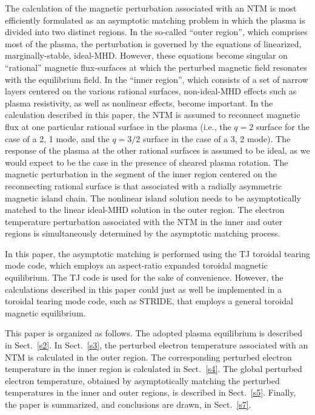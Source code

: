 \documentclass[12pt,prb,aps]{revtex4-1}
\begin{document}
The calculation of the  magnetic perturbation associated with an NTM is most efficiently formulated as an asymptotic matching problem in which the  plasma is  divided into two distinct regions.\cite{tear1,tear2,tear3,tear4,tear5,tear6,tear7,tear8,tear9,tear10}    In the so-called ``outer region'', which comprises most
of the plasma, the perturbation is governed by the equations of linearized, marginally-stable, ideal-MHD.
However, these equations become singular on   ``rational'' magnetic flux-surfaces at which the perturbed magnetic field resonates with the equilibrium field. In the ``inner region'', which
consists of a set of narrow layers centered on the various rational surfaces, non-ideal-MHD effects such as plasma resistivity, as well as nonlinear effects,  become important. 
 In the calculation described in this paper, the NTM is assumed to reconnect magnetic flux at one particular rational surface in the plasma (i.e., the
 $q=2$ surface for the case of a 2, 1 mode, and the $q=3/2$ surface in the case of a 3, 2 mode). The response of the plasma at the
 other rational surfaces is assumed to be ideal, as we would expect to be the case in the presence of sheared plasma rotation.\cite{tear5}
The magnetic perturbation in the segment of the inner region centered on the reconnecting rational surface is that associated with a radially asymmetric magnetic island chain.\cite{ntm1,island}
The nonlinear island solution needs to be asymptotically matched to the linear ideal-MHD solution in the outer region. The
electron temperature perturbation associated with the NTM in the inner and outer regions is simultaneously  determined by the asymptotic matching process. 

In this paper, the asymptotic matching is performed using the TJ toroidal tearing mode code,\cite{tear9,tear10}  which employs an aspect-ratio
expanded toroidal magnetic equilibrium.\cite{exp} The TJ code is used for the sake of convenience. However, the calculations described in this paper
could just as well be implemented in a toroidal tearing mode code, such as STRIDE,\cite{tear7,tear8} that employs a general toroidal magnetic 
equilibrium. 

This paper is organized as follows. The adopted plasma equilibrium is described in Sect.~\ref{s2}.  In Sect.~\ref{s3}, the perturbed electron temperature associated with  an NTM is calculated in the outer region. The corresponding perturbed electron temperature  in the inner region is calculated in Sect.~\ref{s4}. The
global perturbed electron temperature, obtained by asymptotically matching the perturbed temperatures  in  the inner and outer regions, is
described in Sect.~\ref{s5}. 
 Finally, the paper is summarized, and conclusions are drawn, in Sect.~\ref{s7}. 
\end{document}
